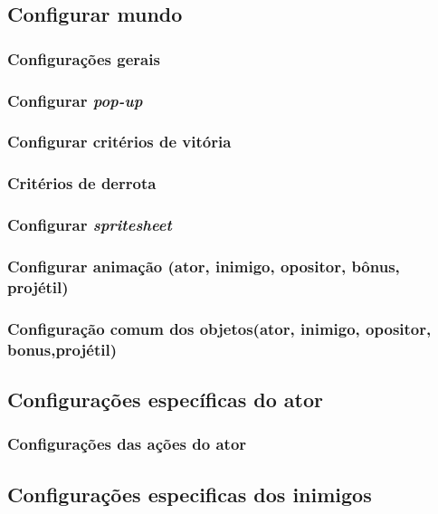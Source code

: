 \documentclass[12pt,twoside,openright,a4paper,english,brazil,sumario=tradicional]{abntex2}
\begin{document}
\begin{anexosenv}
   \subsection{Configurar mundo}


   \subsubsection{Configurações gerais}


   \subsubsection{Configurar \emph{pop-up}}


   \subsubsection{Configurar critérios de vitória}


   \subsubsection{Critérios de derrota}


   \subsubsection{Configurar \emph{spritesheet}}


   \subsubsection{Configurar animação (ator, inimigo, opositor, bônus, projétil)}


   \subsubsection{Configuração comum dos objetos(ator, inimigo, opositor, bonus,projétil)}


   \subsection{Configurações específicas do ator}


   \subsubsection{Configurações das ações do ator}


   \subsection{Configurações especificas dos inimigos}



\end{anexosenv}
\end{document}
